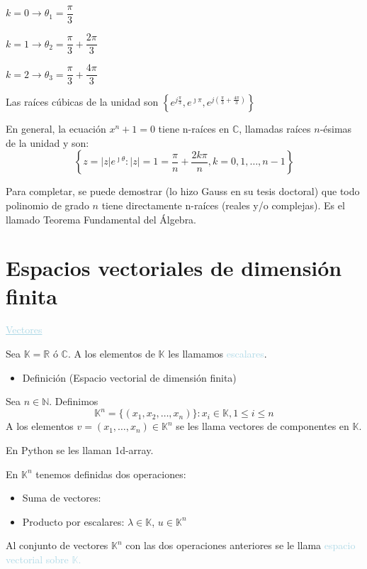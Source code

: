 \documentclass[12pt]{article}
\begin{document}
$k=0\longrightarrow\theta_1=\dfrac{\pi}{3}$

$k=1\longrightarrow\theta_2=\dfrac{\pi}{3}+\dfrac{2\pi}{3}$

$k=2\longrightarrow\theta_3=\dfrac{\pi}{3}+\dfrac{4\pi}{3}$

Las raíces cúbicas de la unidad son $\left\lbrace
e^{j\frac{\pi}{3}},e^{\jmath\pi},e^{j\left(\frac{\pi}{3}+\frac{4\pi}{3}\right)}\right\rbrace$

En general, la ecuación $x^n+1=0$ tiene n-raíces en
$\mathbb{C}$, llamadas raíces $n$-ésimas de la unidad y son:
\[\left\{z=|z|e^{\jmath\theta}:|z|=1=\dfrac{\pi}{n}+\dfrac{2k\pi}{n},k=0,1,\hdots,n-1\right\}\]

Para completar, se puede demostrar (lo hizo Gauss en su tesis
doctoral) que todo polinomio de grado $n$ tiene directamente
n-raíces (reales y/o complejas). Es el llamado Teorema
Fundamental del Álgebra.

\newpage

\section{Espacios vectoriales de dimensión finita}
\textcolor{lightblue}{\underline{Vectores}}

Sea $\mathbb{K}=\mathbb{R}$ ó $\mathbb{C}$. A los elementos de
$\mathbb{K}$ les llamamos \textcolor{lightblue}{escalares}.
\begin{itemize}[label=\color{red}\textbullet, leftmargin=*]
\item \color{lightblue} Definición (Espacio vectorial de
dimensión finita)
\end{itemize}
Sea $n\in\mathbb{N}$. Definimos
\[\mathbb{K}^n=\{(x_1,x_2,\hdots,x_n)\}:x_i\in\mathbb{K},1\le
i\le n\]
A los elementos $v=(x_1,\hdots,x_n)\in\mathbb{K}^n$ se les llama
vectores de componentes en $\mathbb{K}$.

En Python se les llaman 1d-array.

En $\mathbb{K}^n$ tenemos definidas dos operaciones:
\begin{itemize}
    \item Suma de vectores:


\item Producto por escalares: $\lambda\in\mathbb{K}$,
$u\in\mathbb{K}^n$

\end{itemize}
Al conjunto de vectores $\mathbb{K}^n$ con las dos operaciones
anteriores se le llama \textcolor{lightblue}{espacio vectorial
sobre $\mathbb{K}$.}
\end{document}
